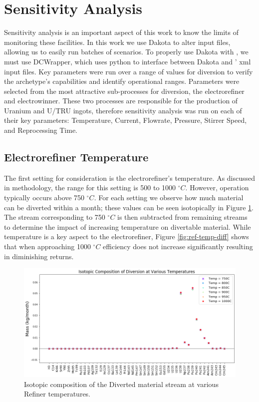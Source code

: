 \section{Sensitivity Analysis}

Sensitivity analysis is an important aspect of this work to know the limits of monitoring these facilities. In this work we use Dakota to alter \Cyclus input files, allowing us to easily
run batches of scenarios. To properly use Dakota with \Cyclus, we must use DCWrapper, which uses python to interface between Dakota and \Cyclus' xml input files. 
Key parameters were run over a range of values for diversion to verify the archetype's capabilities and identify operational ranges. Parameters were selected from the most attractive
sub-processes for diversion, the electrorefiner and electrowinner. These two processes are responsible for the production of Uranium and U/TRU ingots, therefore sensitivity analysis was run
on each of their key parameters: Temperature, Current, Flowrate, Pressure, Stirrer Speed, and Reprocessing Time.

\subsection{Electrorefiner Temperature}

The first setting for consideration is the electrorefiner's temperature. As discussed in methodology, the range for this setting is 500 to 1000 $^\circ C$. However, operation
typically occurs above 750 $^\circ C$. For each setting we observe how much material can be diverted within a month; these values can be seen isotopically in Figure \ref{fig:ref-temp-sa}.
The stream corresponding to 750 $^\circ C$ is then subtracted from remaining streams to determine the impact of increasing temperature on divertable material.
While temperature is a key aspect to the electrorefiner, Figure \ref{fig:ref-temp-diff} shows that when approaching 1000 $^\circ C$ efficiency does not increase significantly resulting
in diminishing returns.

\begin{figure}
	\includegraphics[width=\linewidth]{images/temperature-sa-comp}
	\caption{Isotopic composition of the Diverted material stream at various Refiner temperatures.}
	\label{fig:ref-temp-sa}
\end{figure}

